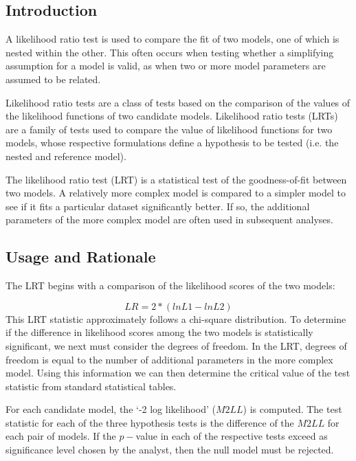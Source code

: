 \documentclass[MAIN.tex]{subfiles}
\begin{document}

\subsection{Introduction}
A likelihood ratio test is used to compare the fit of two models, one of which is nested within the other. This often occurs when testing whether a simplifying assumption for a model is valid, as when two or more model parameters are assumed to be related.

Likelihood ratio tests are a class of tests based on the comparison of the values of the likelihood functions of two candidate models.
Likelihood ratio tests (LRTs) are a family of tests used to compare the value of likelihood functions for two models, whose respective formulations define a hypothesis to be tested (i.e. the nested and reference model). 

The likelihood ratio test (LRT) is a statistical test of the goodness-of-fit between two models. A relatively more complex model is compared to a simpler model to see if it fits a particular dataset significantly better. If so, the additional parameters of the more complex model are often used in subsequent analyses. 



\subsection{Usage and Rationale}
The LRT begins with a comparison of the likelihood scores of the two models:

\[LR = 2*(lnL1-lnL2)\]
This LRT statistic approximately follows a chi-square distribution. To determine if the difference in likelihood scores among the two models is statistically significant, we next must consider the degrees of freedom. In the LRT, degrees of freedom is equal to the number of additional parameters in the more complex model. Using this information we can then determine the critical value of the test statistic from standard statistical tables.

\bigskip 

For each candidate model, the `-2 log likelihood' ($M2LL$) is computed. The test statistic for each of the three hypothesis tests is the difference of the $M2LL$ for each pair of models. If the $p-$value in each of the respective tests exceed as significance level chosen by the analyst, then the null model must be rejected.
\end{document}
